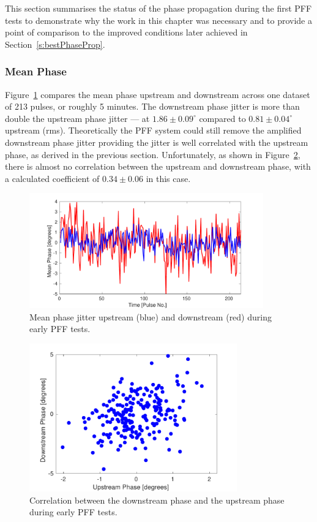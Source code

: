 
This section summarises the status of the phase propagation during the first PFF tests to demonstrate why the work in this chapter was necessary and to provide a point of comparison to the improved conditions later achieved in Section~\ref{s:bestPhaseProp}.

\subsubsection{Mean Phase}

Figure~\ref{f:origMeanPhJit} compares the mean phase upstream and downstream across one dataset of 213 pulses, or roughly 5 minutes. The downstream phase jitter is more than double the upstream phase jitter --- at \(1.86\pm0.09^\circ\) compared to \(0.81\pm0.04^\circ\) upstream (rms). Theoretically the PFF system could still remove the amplified downstream phase jitter providing the jitter is well correlated with the upstream phase, as derived in the previous section. Unfortunately, as shown in Figure~\ref{f:origUpVsDown}, there is almost no correlation between the upstream and downstream phase, with a calculated coefficient of \(0.34\pm0.06\) in this case.

\begin{figure}
  \centering
  \includegraphics[width=0.9\textwidth]{Figures/propagation/origMeanPhJit}
  \caption{Mean phase jitter upstream (blue) and downstream (red) during early PFF tests.}
  \label{f:origMeanPhJit}
\end{figure}

\begin{figure}
  \centering
  \includegraphics[width=0.8\textwidth]{Figures/propagation/origUpVsDown}
  \caption{Correlation between the downstream phase and the upstream phase during early PFF tests.}
  \label{f:origUpVsDown}
\end{figure}

